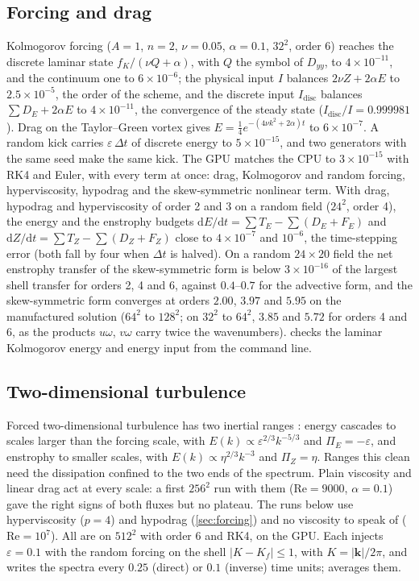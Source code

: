 \documentclass[11pt,a4paper]{article}
\newcommand{\Rey}{\mathrm{Re}}
\newcommand{\code}[1]{\texttt{\detokenize{#1}}}
\begin{document}
\subsection{Forcing and drag}

Kolmogorov forcing ($A=1$, $n=2$, $\nu=0.05$, $\alpha=0.1$, $32^2$, order 6) reaches the discrete laminar state $f_K/(\nu Q+\alpha)$, with $Q$ the symbol of $D_{yy}$, to $4\times10^{-11}$, and the continuum one to $6\times10^{-6}$; the physical input $I$ balances $2\nu Z+2\alpha E$ to $2.5\times10^{-5}$, the order of the scheme, and the discrete input $I_{\mathrm{disc}}$ balances $\sum D_E+2\alpha E$ to $4\times10^{-11}$, the convergence of the steady state ($I_{\mathrm{disc}}/I=0.999981$).  Drag on the Taylor--Green vortex gives $E=\tfrac14e^{-(4\nu k^2+2\alpha)t}$ to $6\times10^{-7}$.  A random kick carries $\varepsilon\,\Delta t$ of discrete energy to $5\times10^{-15}$, and two generators with the same seed make the same kick.  The GPU matches the CPU to $3\times10^{-15}$ with RK4 and Euler, with every term at once: drag, Kolmogorov and random forcing, hyperviscosity, hypodrag and the skew-symmetric nonlinear term.  With drag, hypodrag and hyperviscosity of order 2 and 3 on a random field ($24^2$, order 4), the energy and the enstrophy budgets $\mathrm{d}E/\mathrm{d}t=\sum T_E-\sum(D_E+F_E)$ and $\mathrm{d}Z/\mathrm{d}t=\sum T_Z-\sum(D_Z+F_Z)$ close to $4\times10^{-7}$ and $10^{-6}$, the time-stepping error (both fall by four when $\Delta t$ is halved).  On a random $24\times20$ field the net enstrophy transfer of the skew-symmetric form is below $3\times10^{-16}$ of the largest shell transfer for orders 2, 4 and 6, against $0.4$--$0.7$ for the advective form, and the skew-symmetric form converges at orders $2.00$, $3.97$ and $5.95$ on the manufactured solution ($64^2$ to $128^2$; on $32^2$ to $64^2$, $3.85$ and $5.72$ for orders 4 and 6, as the products $u\omega$, $v\omega$ carry twice the wavenumbers).  \code{make regression} checks the laminar Kolmogorov energy and energy input from the command line.

\subsection{Two-dimensional turbulence}
\label{sec:cascade}

Forced two-dimensional turbulence has two inertial ranges \cite{kraichnan1967}: energy cascades to scales larger than the forcing scale, with $E(k)\propto\varepsilon^{2/3}k^{-5/3}$ and $\Pi_E=-\varepsilon$, and enstrophy to smaller scales, with $E(k)\propto\eta^{2/3}k^{-3}$ and $\Pi_Z=\eta$.  Ranges this clean need the dissipation confined to the two ends of the spectrum.  Plain viscosity and linear drag act at every scale: a first $256^2$ run with them ($\Rey=9000$, $\alpha=0.1$) gave the right signs of both fluxes but no plateau.  The runs below use hyperviscosity ($p=4$) and hypodrag (\cref{sec:forcing}) and no viscosity to speak of ($\Rey=10^7$).  All are on $512^2$ with order 6 and RK4, on the GPU.  Each injects $\varepsilon=0.1$ with the random forcing on the shell $|K-K_f|\le1$, with $K=|\mathbf{k}|/2\pi$, and writes the spectra every $0.25$ (direct) or $0.1$ (inverse) time units; \code{tools/cascade.py} averages them.
\end{document}
